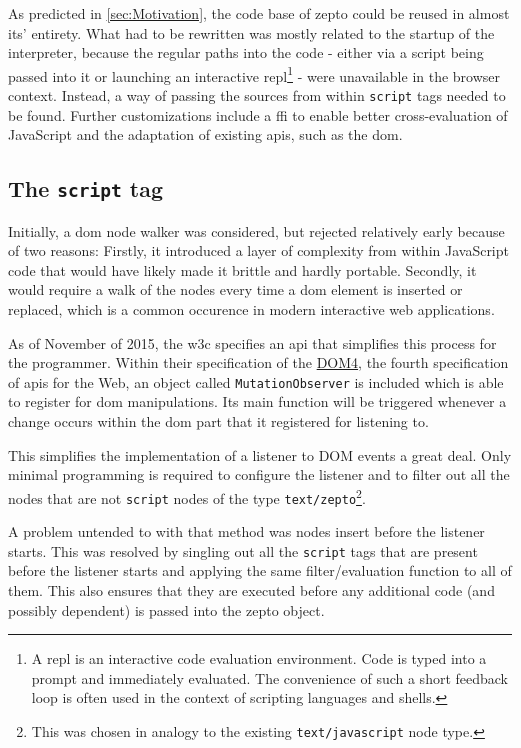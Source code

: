 \documentclass[oneside,11pt,xetex]{scrbook}
\begin{document}
As predicted in \ref{sec:Motivation}, the code base of zepto could be reused in almost its' entirety.
What had to be rewritten was mostly related to the startup of the interpreter, because the regular
paths into the code - either via a script being passed into it or launching an interactive
\gls{repl}\footnote{A \gls{repl} is an interactive code evaluation environment. Code is typed into
a prompt and immediately evaluated. The convenience of such a short feedback loop is often used
in the context of scripting languages and shells.} - were unavailable in the browser context.
Instead, a way of passing the sources from within \texttt{script} tags needed to be found. Further
customizations include a \gls{ffi} to enable better cross-evaluation of JavaScript and the adaptation
of existing \gls{api}s, such as the \gls{dom}.

\subsection{The \texttt{script} tag}
\label{sec:MutObs}

Initially, a \gls{dom} node walker was considered, but rejected relatively early because of two reasons:
Firstly, it introduced a layer of complexity from within JavaScript code that would have likely made
it brittle and hardly portable. Secondly, it would require a walk of the nodes every time a \gls{dom}
element is inserted or replaced, which is a common occurence in modern interactive web applications.

As of November of 2015, the \gls{w3c} specifies an \gls{api} that simplifies this process for the programmer.
Within their specification of the \href{https://www.w3.org/TR/dom/#mutationobserver}{DOM4}\parencite{DOM4}, the fourth
specification of \gls{api}s for the Web, an object called \texttt{MutationObserver} is included which
is able to register for \gls{dom} manipulations. Its main function will be triggered whenever a change
occurs within the \gls{dom} part that it registered for listening to.

This simplifies the implementation of a listener to DOM events a great deal. Only minimal programming
is required to configure the listener and to filter out all the nodes that are not \texttt{script} nodes
of the type \texttt{text/zepto}\footnote{This was chosen in analogy to the existing \texttt{text/javascript}
node type.}.

A problem untended to with that method was nodes insert before the listener starts. This was resolved by
singling out all the \texttt{script} tags that are present before the listener starts and applying the
same filter/evaluation function to all of them. This also ensures that they are executed before any
additional code (and possibly dependent) is passed into the zepto object.
\end{document}
